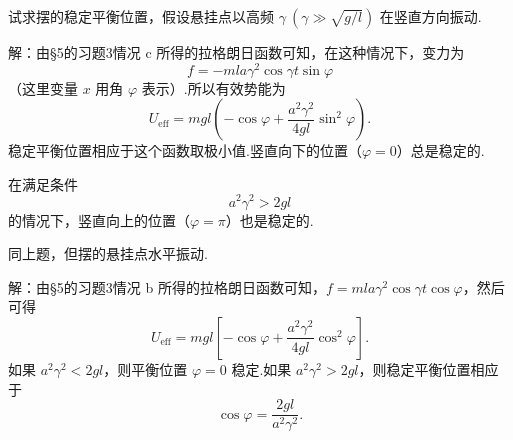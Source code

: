 \begin{xiti}

\quad 试求摆的稳定平衡位置，假设悬挂点以高频 $\gamma\ (\gamma\gg\sqrt{g/l})$ 在竖直方向振动.

解：由§5的习题3情况 c 所得的拉格朗日函数可知，在这种情况下，变力为
\begin{equation*}
  f=-mla\gamma^2\cos\gamma t\sin\varphi
\end{equation*}
（这里变量 $x$ 用角 $\varphi$ 表示）.所以有效势能为
\begin{equation*}
  U_{\mathrm{eff}}=mgl\left(-\cos\varphi+\frac{a^2\gamma^2}{4gl}\sin^2\varphi\right).
\end{equation*}
稳定平衡位置相应于这个函数取极小值.竖直向下的位置（$\varphi=0$）总是稳定的.

在满足条件
\begin{equation*}
  a^2\gamma^2>2gl
\end{equation*}
的情况下，竖直向上的位置（$\varphi=\pi$）也是稳定的.

\quad 同上题，但摆的悬挂点水平振动.

解：由§5的习题3情况 b 所得的拉格朗日函数可知，$f=mla\gamma^2\cos\gamma t\cos\varphi$，然后可得
\begin{equation*}
  U_{\mathrm{eff}}=mgl\left[-\cos\varphi+\frac{a^2\gamma^2}{4gl}\cos^2\varphi\right].
\end{equation*}
如果 $a^2\gamma^2<2gl$，则平衡位置 $\varphi=0$ 稳定.如果 $a^2\gamma^2>2gl$，则稳定平衡位置相应于
\begin{equation*}
  \cos\varphi=\frac{2gl}{a^2\gamma^2}.
\end{equation*}

\end{xiti}
